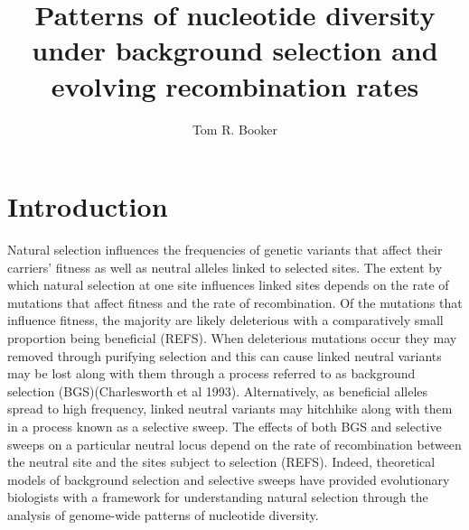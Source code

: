 \documentclass[11pt,twoside,lineno]{GSA_format}
\title{Patterns of nucleotide diversity under background selection and evolving recombination rates}
\author[$\ast$]{Tom R. Booker}
\affil[$\ast$]{University of British Columbia}
\begin{document}
\maketitle
\marginmark
\firstpagefootnote


\vspace{-33pt}%

\section{Introduction}

Natural selection influences the frequencies of genetic variants that affect their carriers' fitness as well as neutral alleles linked to selected sites. The extent by which natural selection at one site influences linked sites depends on the rate of mutations that affect fitness and the rate of recombination. Of the mutations that influence fitness, the majority are likely deleterious with a comparatively small proportion being beneficial (REFS). When deleterious mutations occur they may removed through purifying selection and this can cause linked neutral variants may be lost along with them through a process referred to as background selection (BGS)(Charlesworth et al 1993). Alternatively, as beneficial alleles spread to high frequency, linked neutral variants may hitchhike along with them in a process known as a selective sweep. The effects of both BGS and selective sweeps on a particular neutral locus depend on the rate of recombination between the neutral site and the sites subject to selection (REFS). Indeed, theoretical models of background selection and selective sweeps have provided evolutionary biologists with a framework for understanding natural selection through the analysis of genome-wide patterns of nucleotide diversity. \\
\end{document}
